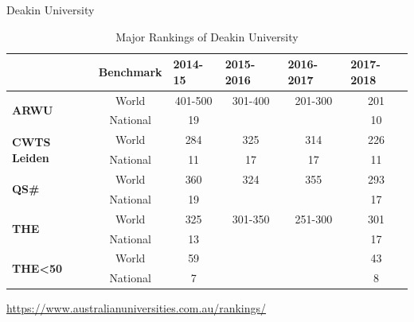 \documentclass[
 size=14pt,
 paper=smartboard,  %
 mode=present, 		%
 display=slides, 	%
 style=tuliplab,  	%
 pauseslide,
 fleqn,leqno]{powerdot}{}
\begin{document}


\begin{slide}[toc=,bm=]{Deakin University}
\begin{table}[htbp]
  \setlength{\abovecaptionskip}{-21pt}
  \setlength{\belowcaptionskip}{12pt}
  \centering
  \caption{Major Rankings of Deakin University}
    \begin{tabular}{l|c|cccc}
    \toprule
      & \textbf{Benchmark} & \multicolumn{1}{l}{\textbf{2014-15}} & \multicolumn{1}{l}{\textbf{2015-2016}} & \multicolumn{1}{l}{\textbf{2016-2017}} & \multicolumn{1}{l}{\textbf{2017-2018}} \\ \midrule
    \multirow{2}[0]{*}{\textbf{ARWU}} & World & 401-500 & 301-400 & 201-300 & 201 \\
      & National  & 19 &   &   & 10 \\
      \midrule
    \multirow{2}[0]{*}{\textbf{CWTS Leiden}} & World  & 284 & 325 & 314 & 226 \\
      & National  & 11 & 17 & 17 & 11 \\
      \midrule
    \multirow{2}[0]{*}{\textbf{QS\#}} & World  & 360 & 324 & 355 & 293 \\
      & National & 19 &   &   & 17 \\
      \midrule
    \multirow{2}[0]{*}{\textbf{THE} } & World  & 325 & 301-350 & 251-300 & 301 \\
      & National  & 13 &   &   & 17 \\
      \midrule
    \multirow{2}[0]{*}{\textbf{THE<50}} & World  & 59 &   &   & 43 \\
      & National  & 7 &   &   & 8 \\
      \bottomrule
    \end{tabular}
  \label{tab:Deakin Ranking}
\end{table}
\centering
\url{https://www.australianuniversities.com.au/rankings/}
\end{slide}

\end{document}
